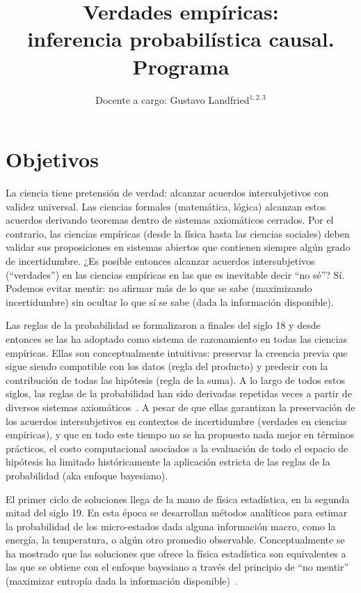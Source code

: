 \documentclass[10pt]{article}
\title{\huge Verdades empíricas: \\ inferencia probabilística causal. \\[0.4cm]  \LARGE Programa}
\author{Docente a cargo: Gustavo Landfried$^{1,2,3}$}
\affil{\small 1. Departamento de Computación. \\ Facultad de Ciencias Exactas y Naturales.  \\ Universidad de Buenos Aires. }
\affil{\vspace{-0.2cm}\small 2. Laboratorios de Métodos Bayesianos}
\affil{\vspace{-0.2cm}\small 3. Bayes Plurinacional}
\affil[]{Correspondencia: \texttt{glandfried@dc.uba.ar}}
\begin{document}
\maketitle

\section{Objetivos}

La ciencia tiene pretensión de verdad: alcanzar acuerdos intersubjetivos con validez universal.
Las ciencias formales (matemática, lógica) alcanzan estos acuerdos derivando teoremas dentro de sistemas axiomáticos cerrados.
Por el contrario, las ciencias empíricas (desde la física hasta las ciencias sociales) deben validar sus proposiciones en sistemas abiertos que contienen siempre algún grado de incertidumbre.
¿Es posible entonces alcanzar acuerdos intersubjetivos (``verdades'') en las ciencias empíricas en las que es inevitable decir ``no sé''?
Sí.
Podemos evitar mentir: no afirmar más de lo que se sabe (maximizando incertidumbre) sin ocultar lo que sí se sabe (dada la información disponible).


Las reglas de la probabilidad se formalizaron a finales del siglo 18 y desde entonces se las ha adoptado como sistema de razonamiento en todas las ciencias empíricas.
Ellas son conceptualmente intuitivas: preservar la creencia previa que sigue siendo compatible con los datos (regla del producto) y predecir con la contribución de todas las hipótesis (regla de la suma).
A lo largo de todos estos siglos, las reglas de la probabilidad han sido derivadas repetidas veces a partir de diversos sistemas axiomáticos~\cite{halpern2017}.
A pesar de que ellas garantizan la preservación de los acuerdos intersubjetivos en contextos de incertidumbre (verdades en ciencias empíricas), y que en todo este tiempo no se ha propuesto nada mejor en términos prácticos, el costo computacional asociados a la evaluación de todo el espacio de hipótesis ha limitado históricamente la aplicación estricta de las reglas de la probabilidad (aka enfoque bayesiano).


El primer ciclo de soluciones llega de la mano de física estadística, en la segunda mitad del siglo 19.
En esta época se desarrollan métodos analíticos para estimar la probabilidad de los micro-estados dada alguna información macro, como la energía, la temperatura, o algún otro promedio observable.
Conceptualmente se ha mostrado que las soluciones que ofrece la física estadística son equivalentes a las que se obtiene con el enfoque bayesiano a través del principio de ``no mentir'' (maximizar entropía dada la información disponible)~\cite{jaynes1957-informationTheoryAndStatisticalMechanics, jaynes2003-bookProbabilityTheory}.
\end{document}
